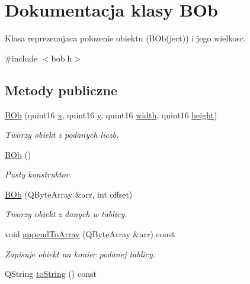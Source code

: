 \hypertarget{class_b_ob}{
\section{Dokumentacja klasy BOb}
\label{class_b_ob}
}


Klasa reprezenujaca polozenie obiektu (BOb(ject)) i jego wielkosc.  




{\ttfamily \#include $<$bob.h$>$}

\subsection*{Metody publiczne}
\begin{DoxyCompactItemize}
\item 
\hypertarget{class_b_ob_acda4962a7ee72394a87ba34e09eb23f6}{
\hyperlink{class_b_ob_acda4962a7ee72394a87ba34e09eb23f6}{BOb} (quint16 \hyperlink{class_b_ob_a5dcc6a3c2f4ffaf3d630187e853dd876}{x}, quint16 \hyperlink{class_b_ob_ada96bf49e446d3f9a5ce02f36e44c9b4}{y}, quint16 \hyperlink{class_b_ob_a3e1652784396111952cd16a77a666a2b}{width}, quint16 \hyperlink{class_b_ob_ac406681bc6029dc6e41aa53791e9f210}{height})}
\label{class_b_ob_acda4962a7ee72394a87ba34e09eb23f6}

\begin{DoxyCompactList}\small\item\em Tworzy obiekt z podanych liczb. \item\end{DoxyCompactList}\item 
\hypertarget{class_b_ob_abe1a4712878bfad0ccdbf9b2839c6a70}{
\hyperlink{class_b_ob_abe1a4712878bfad0ccdbf9b2839c6a70}{BOb} ()}
\label{class_b_ob_abe1a4712878bfad0ccdbf9b2839c6a70}

\begin{DoxyCompactList}\small\item\em Pusty konstruktor. \item\end{DoxyCompactList}\item 
\hyperlink{class_b_ob_ab71739ff83cf58d15b42f26274c583d1}{BOb} (QByteArray \&arr, int offset)
\begin{DoxyCompactList}\small\item\em Tworzy obiekt z danych w tablicy. \item\end{DoxyCompactList}\item 
void \hyperlink{class_b_ob_a11fbd7ab4c8dda600232b40b02a20cbe}{appendToArray} (QByteArray \&arr) const 
\begin{DoxyCompactList}\small\item\em Zapisuje obiekt na koniec podanej tablicy. \item\end{DoxyCompactList}\item 
\hypertarget{class_b_ob_a17bbb520d60e0a98312b185f5e9bc928}{
QString \hyperlink{class_b_ob_a17bbb520d60e0a98312b185f5e9bc928}{toString} () const }
\label{class_b_ob_a17bbb520d60e0a98312b185f5e9bc928}


\end{DoxyCompactItemize}
